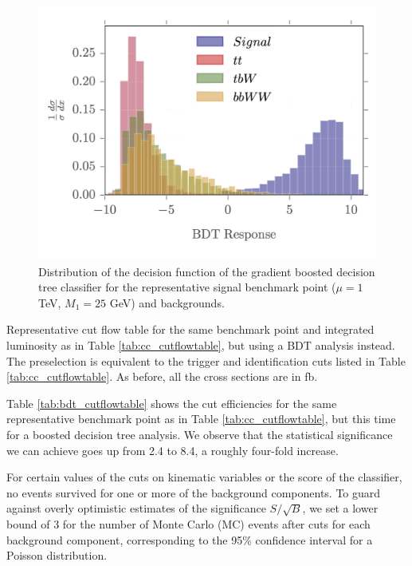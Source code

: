 \documentclass[a4paper,11pt]{article}
\begin{document}
\begin{figure}[h]
\centering
\includegraphics[trim = {0 0.5cm 0 0},clip]{images/bdt_response_png}
\caption{Distribution of the decision function of the gradient boosted decision
tree classifier for   the representative signal benchmark point ($\mu = 1$ TeV, $M_1 = 25$ GeV) and backgrounds.}
\label{fig:bdt_response}
\end{figure}

\begin{table}[h]
  \centering
  
  \caption{Representative cut flow table for the same benchmark point and
    integrated luminosity as in Table \ref{tab:cc_cutflowtable}, but using a BDT  analysis instead. The preselection is equivalent
    to the trigger and identification cuts listed in Table
    \ref{tab:cc_cutflowtable}. As before, all the cross sections are in
  fb.  }
\label{tab:bdt_cutflowtable}
\end{table}

Table \ref{tab:bdt_cutflowtable} shows the cut efficiencies for the same
representative benchmark point as in Table \ref{tab:cc_cutflowtable}, but this
time for a boosted decision tree analysis. We observe that the statistical
significance we can achieve goes up from 2.4 to 8.4, a roughly four-fold
increase.  

For certain values of the
cuts on kinematic variables or the score of the classifier, no events survived
for one or more of the background components. To guard against overly optimistic
estimates of the significance $S/\sqrt{B}$, we set a lower bound of 3 for the
number of Monte Carlo (MC) events after cuts for each background component, corresponding to
the 95\% confidence interval for a Poisson distribution. 
\end{document}

